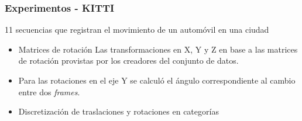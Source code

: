 \documentclass{beamer}
\begin{document}
\begin{frame}[plain]
\frametitle{Experimentos - KITTI}
\vfill
11 secuencias que registran el movimiento de un automóvil en una ciudad\vfill
\begin{figure}
\centering
{}
\end{figure}
\vfill
\begin{itemize}
    \item Matrices de rotación Las transformaciones en X, Y y Z en base a las matrices de rotación provistas por los creadores del conjunto de datos.
    \item Para las rotaciones en el eje Y se calculó el ángulo correspondiente al cambio entre dos \textit{frames}.
    \item Discretización de traslaciones y rotaciones en categorías
\end{itemize}
\vfill
\end{frame}
\end{document}
